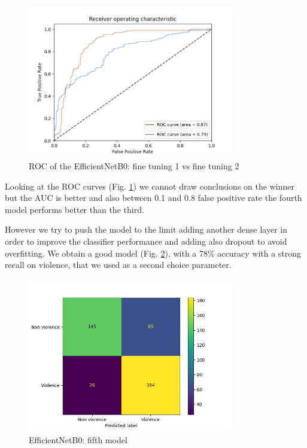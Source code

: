 \begin{figure}[h!]
    \centering
    \includegraphics[width=0.8\textwidth]{images/ROCEfficientNet.png}
    \caption{ROC of the EfficientNetB0: fine tuning 1 vs fine tuning 2}
    \label{fig:EfficientNetB0_ROC}
\end{figure}

Looking at the ROC curves (Fig. \ref{fig:EfficientNetB0_ROC}) we cannot draw conclusions on the winner but the AUC is better and also between 0.1 and 0.8 false positive rate the fourth model performs better than the third. 

However we try to push the model to the limit adding another dense layer in order to improve the classifier performance and adding also dropout to avoid overfitting.
We obtain a good model (Fig. \ref{fig:EfficientNetB0_24}), with a 78\% accuracy with a strong recall on violence, that we used as a second choice parameter. 
\begin{figure}[h!]
    \centering
    \includegraphics[width=0.8\textwidth]{images/731a-EfficientNetB0_24-b2b1-conf_matrix.png}
    \caption{EfficientNetB0: fifth model}
    \label{fig:EfficientNetB0_24}
\end{figure}

